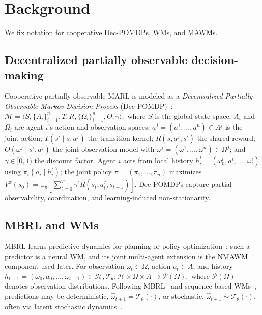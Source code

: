 \documentclass{article}
\theoremstyle{plain}
\theoremstyle{definition}
\theoremstyle{remark}
\begin{document}
\section{Background}
\label{sec:background}

We fix notation for cooperative Dec-POMDPs, WMs, and MAWMs.

\subsection{Decentralized partially observable decision-making}
\label{sec:decpomdp}

Cooperative partially observable MARL is modeled as a \emph{Decentralized Partially Observable Markov Decision Process} (Dec-POMDP)~\cite{oliehoek2016concise}:
$\mathcal{M} = \langle S, \{A_i\}_{i=1}^n, T, R, \{\Omega_i\}_{i=1}^n, O, \gamma \rangle,$
where $S$ is the global state space; $A_i$ and $\Omega_i$ are agent $i$'s action and observation spaces; $a^j=(a^1,\dots,a^n)\in A^j$ is the joint-action; $T(s'\mid s,a^j)$ the transition kernel; $R(s,a^j,s')$ the shared reward; $O(\omega^j\mid s',a^j)$ the joint-observation model with $\omega^j=(\omega^1,\dots,\omega^n)\in\Omega^j$; and $\gamma\in[0,1)$ the discount factor.
Agent $i$ acts from local history $h_i^t=(\omega_0^i,a_0^i,\dots,\omega_t^i)$ using $\pi_i(a_i\mid h_i^t)$; the joint policy $\pi=(\pi_1,\dots,\pi_n)$ maximizes
$V^\pi(s_0) = \mathbb{E}_\pi \left[ \sum_{t=0}^{T} \gamma^t R(s_t, a^j_t, s_{t+1}) \right].$
Dec-POMDPs capture partial observability, coordination, and learning-induced non-stationarity.

\subsection{MBRL and WMs}
\label{sec:mbrl}

MBRL learns predictive dynamics for planning or policy optimization~\cite{moerland2023modelbased}; such a predictor is a neural WM, and its joint multi-agent extension is the NMAWM component used later. For observation $\omega_t\in\Omega$, action $a_t\in A$, and history $h_{t-1}=(\omega_0,a_0,\dots,\omega_{t-1})\in\mathcal{H},
  \mathcal{T}_\theta : \mathcal{H} \times \Omega \times A \rightarrow \mathcal{P}(\Omega),$
where $\mathcal{P}(\Omega)$ denotes observation distributions. Following MBRL~\cite{moerland2023modelbased} and sequence-based WMs~\cite{ha2018worldmodels}, predictions may be deterministic, $\hat{\omega}_{t+1}=\mathcal{T}_\theta(\cdot)$, or stochastic, $\hat{\omega}_{t+1}\sim\mathcal{T}_\theta(\cdot)$, often via latent stochastic dynamics~\cite{hafner2019dreamer}.
\end{document}
